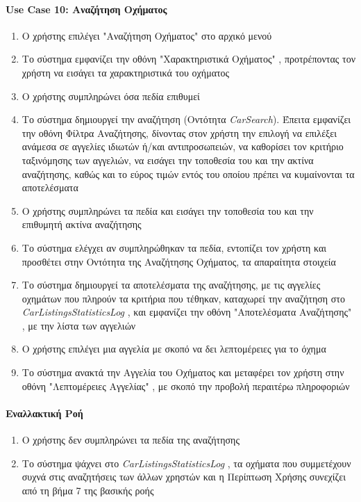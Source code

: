 \documentclass{../ol-softwaremanual}
\begin{document}
	
	
	\newpage
	\centering
	\paragraph{\en Use Case 10: \gr Αναζήτηση Οχήματος}  
	\begin{enumerate}
		\item Ο χρήστης επιλέγει \en"\gr Αναζήτηση Οχήματος\en" \gr στο αρχικό μενού
		\item Το σύστημα εμφανίζει την οθόνη \en"\gr Χαρακτηριστικά Οχήματος\en" \gr, προτρέποντας τον χρήστη να εισάγει τα χαρακτηριστικά του οχήματος 
		\item Ο χρήστης συμπληρώνει όσα πεδία επιθυμεί
		\item Το σύστημα δημιουργεί την αναζήτηση (Οντότητα \en \textit{CarSearch}\gr). Έπειτα εμφανίζει την οθόνη Φίλτρα Αναζήτησης, δίνοντας στον χρήστη την επιλογή να επιλέξει ανάμεσα σε αγγελίες ιδιωτών ή/και αντιπροσωπειών, να καθορίσει τον κριτήριο ταξινόμησης των αγγελιών, να εισάγει την τοποθεσία του και την ακτίνα αναζήτησης, καθώς και το εύρος τιμών εντός του οποίου πρέπει να κυμαίνονται τα αποτελέσματα
		\item Ο χρήστης συμπληρώνει τα πεδία και εισάγει την τοποθεσία του και την επιθυμητή ακτίνα αναζήτησης
		\item Το σύστημα ελέγχει αν συμπληρώθηκαν τα πεδία, εντοπίζει τον χρήστη και προσθέτει στην Οντότητα της Αναζήτησης Οχήματος, τα απαραίτητα στοιχεία
		\item Το σύστημα δημιουργεί τα αποτελέσματα της αναζήτησης, με τις αγγελίες οχημάτων που πληρούν τα κριτήρια που τέθηκαν, καταχωρεί την αναζήτηση στο \en \textit{CarListingsStatisticsLog} \gr, και εμφανίζει την οθόνη \en"\gr Αποτελέσματα Αναζήτησης\en" \gr, με την λίστα των αγγελιών 
		\item Ο χρήστης επιλέγει μια αγγελία με σκοπό να δει λεπτομέρειες για το όχημα
		\item Το σύστημα ανακτά την Αγγελία του Οχήματος και μεταφέρει τον χρήστη στην οθόνη \en"\gr Λεπτομέρειες Αγγελίας\en" \gr, με σκοπό την προβολή περαιτέρω πληροφοριών	
	\end{enumerate}
	
	
	\paragraph{Εναλλακτική Ροή}
	\begin{enumerate}
		\item Ο χρήστης δεν συμπληρώνει τα πεδία της αναζήτησης
		\item Το σύστημα ψάχνει στο \en \textit{CarListingsStatisticsLog} \gr, τα οχήματα που συμμετέχουν συχνά στις αναζητήσεις των άλλων χρηστών και η Περίπτωση Χρήσης συνεχίζει από τη βήμα 7 της βασικής ροής
	\end{enumerate}
	
\end{document}

